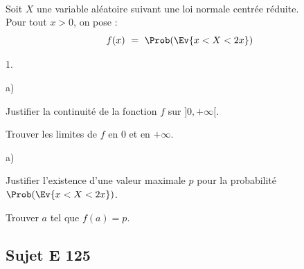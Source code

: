 \documentclass[11pt]{article}%
\begin{document}
\begin{exerciceSP}~\\
  Soit $X$ une variable aléatoire suivant une loi normale centrée
  réduite.\\
  Pour tout $x>0$, on pose :
  \[
    f(x) \ = \ \Prob(\Ev{x < X < 2x})
  \]
  \begin{noliste}{1.}
    \setlength{\itemsep}{2mm}
  \item
    \begin{noliste}{a)}
      \setlength{\itemsep}{2mm}
    \item Justifier la continuité de la fonction $f$ sur $]0,+\infty[$.
      
    \item Trouver les limites de $f$ en $0$ et en $+\infty$.
    \end{noliste}
    
  \item
    \begin{noliste}{a)}
      \setlength{\itemsep}{2mm}
    \item Justifier l'existence d'une valeur maximale $p$ pour la
      probabilité $\Prob(\Ev{x < X < 2x})$.
      
    \item Trouver $a$ tel que $f(a) = p$.
    \end{noliste}
  \end{noliste}
\end{exerciceSP}


\newpage


\subsection*{Sujet E 125}
\end{document}
